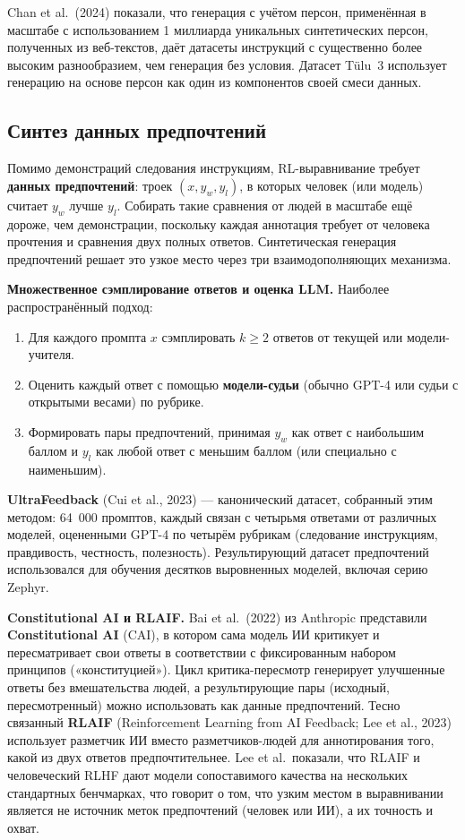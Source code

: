 Chan et al.\ (2024) показали, что генерация с учётом персон, применённая в масштабе с использованием 1 миллиарда уникальных синтетических персон, полученных из веб-текстов, даёт датасеты инструкций с существенно более высоким разнообразием, чем генерация без условия. Датасет T\"{u}lu~3 использует генерацию на основе персон как один из компонентов своей смеси данных.

\subsection{Синтез данных предпочтений}

Помимо демонстраций следования инструкциям, RL-выравнивание требует \textbf{данных предпочтений}: троек $(x, y_w, y_l)$, в которых человек (или модель) считает $y_w$ лучше $y_l$. Собирать такие сравнения от людей в масштабе ещё дороже, чем демонстрации, поскольку каждая аннотация требует от человека прочтения и сравнения двух полных ответов. Синтетическая генерация предпочтений решает это узкое место через три взаимодополняющих механизма.

\textbf{Множественное сэмплирование ответов и оценка LLM.} Наиболее распространённый подход:
\begin{enumerate}[leftmargin=*]
  \item Для каждого промпта $x$ сэмплировать $k \geq 2$ ответов от текущей или модели-учителя.
  \item Оценить каждый ответ с помощью \textbf{модели-судьи} (обычно GPT-4 или судьи с открытыми весами) по рубрике.
  \item Формировать пары предпочтений, принимая $y_w$ как ответ с наибольшим баллом и $y_l$ как любой ответ с меньшим баллом (или специально с наименьшим).
\end{enumerate}

\textbf{UltraFeedback} (Cui et al., 2023) --- канонический датасет, собранный этим методом: 64~000 промптов, каждый связан с четырьмя ответами от различных моделей, оцененными GPT-4 по четырём рубрикам (следование инструкциям, правдивость, честность, полезность). Результирующий датасет предпочтений использовался для обучения десятков выровненных моделей, включая серию Zephyr.

\textbf{Constitutional AI и RLAIF.} Bai et al.\ (2022) из Anthropic представили \textbf{Constitutional AI} (CAI), в котором сама модель ИИ критикует и пересматривает свои ответы в соответствии с фиксированным набором принципов («конституцией»). Цикл критика-пересмотр генерирует улучшенные ответы без вмешательства людей, а результирующие пары (исходный, пересмотренный) можно использовать как данные предпочтений. Тесно связанный \textbf{RLAIF} (Reinforcement Learning from AI Feedback; Lee et al., 2023) использует разметчик ИИ вместо разметчиков-людей для аннотирования того, какой из двух ответов предпочтительнее. Lee et al.\ показали, что RLAIF и человеческий RLHF дают модели сопоставимого качества на нескольких стандартных бенчмарках, что говорит о том, что узким местом в выравнивании является не источник меток предпочтений (человек или ИИ), а их точность и охват.

